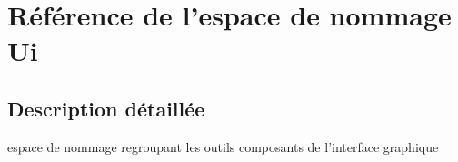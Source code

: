 \hypertarget{namespaceUi}{
\section{Référence de l'espace de nommage Ui}
\label{namespaceUi}
}


\subsection{Description détaillée}
espace de nommage regroupant les outils composants de l'interface graphique 